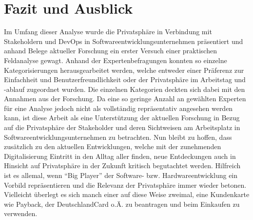 \chapter{Fazit und Ausblick} %
\label{Conclusion} %

Im Umfang dieser Analyse wurde die Privatsphäre in Verbindung mit Stakeholdern und DevOps in Softwareentwicklungsunternehmen präsentiert
und anhand Belege aktueller Forschung ein erster Versuch einer praktischen Feldanalyse gewagt. Anhand der Expertenbefragungen konnten so einzelne
Kategorisierungen herausgearbeitet werden, welche entweder einer Präferenz zur Einfachheit und Benutzerfreundlichkeit oder der Privatsphäre im Arbeitstag
und -ablauf zugeordnet wurden. Die einzelnen Kategorien deckten sich dabei mit den Annahmen aus der Forschung. \newline
Da eine so geringe Anzahl an gewählten Experten für eine Analyse jedoch nicht als vollständig repräsentativ angesehen werden kann, ist diese Arbeit als eine
Unterstützung der aktuellen Forschung in Bezug auf die Privatsphäre der Stakeholder und deren Sichtweisen am Arbeitsplatz in Softwareentwicklungsunternehmen
zu betrachten. \newline \newline
Nun bleibt zu hoffen, dass zusätzlich zu den aktuellen Entwicklungen, welche mit der zunehmenden Digitalisierung Eintritt in den Alltag aller finden, neue Entdeckungen
auch in Hinsicht auf Privatsphäre in der Zukunft kritisch begutachtet werden. Hilfreich ist es allemal, wenn \enquote{Big Player} der Software- bzw. Hardwareentwicklung
ein Vorbild repräsentieren und die Relevanz der Privatsphäre immer wieder betonen. \newline Vielleicht überlegt es sich manch einer auf diese Weise zweimal, eine Kundenkarte
wie Payback, der DeutschlandCard o.Ä. zu beantragen und beim Einkaufen zu verwenden.